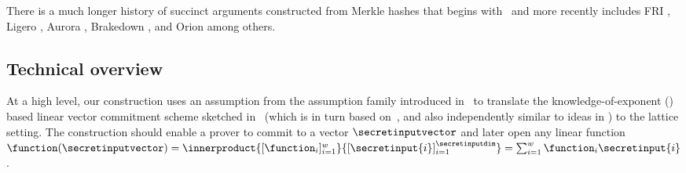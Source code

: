 
There is a much longer history of succinct arguments constructed from Merkle hashes that begins with~\cite{STOC:Kilian92} and more recently includes FRI \cite{C:BBHR19}, Ligero \cite{CCS:AHIV17}, Aurora \cite{EC:BCRSVW19}, Brakedown \cite{C:GLSTW23}, and Orion \cite{C:XieZhaSon22} among others.




\subsection{Technical overview}
\label{sec:technical-overview}

At a high level, our construction uses an assumption from the \krisis assumption family introduced in~\cite{C:ACLMT22} to translate the knowledge-of-exponent (\kea) based linear vector commitment scheme sketched in~\cite[section 9]{ac20} (which is in turn based on~\cite{AC:Groth10a}, and also independently similar to ideas in \cite{ICALP:LibRamYun16}) to the lattice setting. %
The construction should enable a prover to commit to a vector $\secretinputvector$ and later open any linear function $\function (\secretinputvector) = \innerproduct{[\function_i]_{i=1}^w}{[\secretinput{i}]_{i=1}^\secretinputdim}
= \sum_{i=1}^w \function_i \secretinput{i}$.


